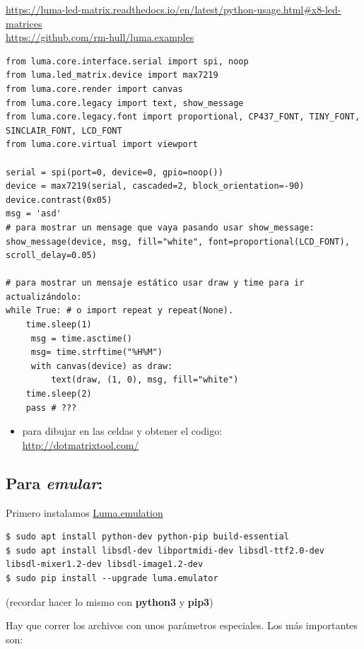\url{https://luma-led-matrix.readthedocs.io/en/latest/python-usage.html\#x8-led-matrices}\\
\url{https://github.com/rm-hull/luma.examples}\\
\begin{verbatim}
from luma.core.interface.serial import spi, noop
from luma.led_matrix.device import max7219
from luma.core.render import canvas
from luma.core.legacy import text, show_message
from luma.core.legacy.font import proportional, CP437_FONT, TINY_FONT, SINCLAIR_FONT, LCD_FONT
from luma.core.virtual import viewport

serial = spi(port=0, device=0, gpio=noop())
device = max7219(serial, cascaded=2, block_orientation=-90)
device.contrast(0x05)
msg = 'asd'
# para mostrar un mensage que vaya pasando usar show_message: 
show_message(device, msg, fill="white", font=proportional(LCD_FONT), scroll_delay=0.05)

# para mostrar un mensaje estático usar draw y time para ir actualizándolo:
while True: # o import repeat y repeat(None). 
    time.sleep(1)
     msg = time.asctime()
     msg= time.strftime("%H%M")
     with canvas(device) as draw:
         text(draw, (1, 0), msg, fill="white")
    time.sleep(2)
    pass # ???
\end{verbatim}
\begin{itemize}
\itemsep1pt\parskip0pt
\item
  para dibujar en las celdas y obtener el codigo:\\
  \url{http://dotmatrixtool.com/}
\end{itemize}

\subsection{Para \emph{emular}:}\label{emu}

Primero instalamos
\href{https://luma-emulator.readthedocs.io/en/latest/index.html}{Luma.emulation}

\begin{Verbatim}[breaklines=true, breakanywhere=true]
$ sudo apt install python-dev python-pip build-essential
$ sudo apt install libsdl-dev libportmidi-dev libsdl-ttf2.0-dev libsdl-mixer1.2-dev libsdl-image1.2-dev
$ sudo pip install --upgrade luma.emulator
\end{Verbatim}

(recordar hacer lo mismo con \textbf{python3} y \textbf{pip3})

Hay que correr los archivos con unos parámetros especiales. Los más
importantes son:

